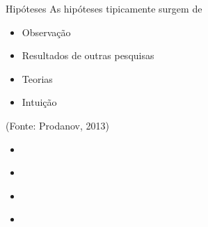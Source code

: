 \documentclass{beamer}
\begin{document}
\begin{frame}{Hipóteses}
  As hipóteses tipicamente surgem de
  \begin{itemize}
  \item Observação
  \item Resultados de outras pesquisas
  \item Teorias
  \item Intuição
  \end{itemize}
  (Fonte: Prodanov, 2013)
\end{frame}


\begin{frame}{}
  \begin{itemize}
  \item 
  \end{itemize}
\end{frame}


\begin{frame}{}
  \begin{itemize}
  \item 
  \end{itemize}
\end{frame}

\begin{frame}{}
  \begin{itemize}
  \item 
  \end{itemize}
\end{frame}

\begin{frame}{}
  \begin{itemize}
  \item 
  \end{itemize}
\end{frame}
\end{document}
